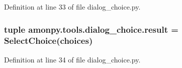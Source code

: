 Definition at line 33 of file dialog\-\_\-choice.\-py.

\hypertarget{namespaceamonpy_1_1tools_1_1dialog__choice_a4ee52ccd986880002ff77037e4f8f23a}{
\subsubsection[{result}]{\setlength{\rightskip}{0pt plus 5cm}tuple amonpy.\-tools.\-dialog\-\_\-choice.\-result = {\bf Select\-Choice}({\bf choices})}}\label{namespaceamonpy_1_1tools_1_1dialog__choice_a4ee52ccd986880002ff77037e4f8f23a}


Definition at line 34 of file dialog\-\_\-choice.\-py.

